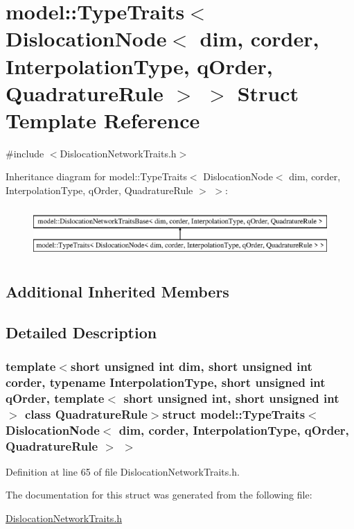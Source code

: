 \hypertarget{structmodel_1_1_type_traits_3_01_dislocation_node_3_01dim_00_01corder_00_01_interpolation_type_0c5626ad89ae64c98a058e51061d11ac7}{}\section{model\+:\+:Type\+Traits$<$ Dislocation\+Node$<$ dim, corder, Interpolation\+Type, q\+Order, Quadrature\+Rule $>$ $>$ Struct Template Reference}
\label{structmodel_1_1_type_traits_3_01_dislocation_node_3_01dim_00_01corder_00_01_interpolation_type_0c5626ad89ae64c98a058e51061d11ac7}


{\ttfamily \#include $<$Dislocation\+Network\+Traits.\+h$>$}

Inheritance diagram for model\+:\+:Type\+Traits$<$ Dislocation\+Node$<$ dim, corder, Interpolation\+Type, q\+Order, Quadrature\+Rule $>$ $>$\+:\begin{figure}[H]
\begin{center}
\leavevmode
\includegraphics[height=1.937716cm]{structmodel_1_1_type_traits_3_01_dislocation_node_3_01dim_00_01corder_00_01_interpolation_type_0c5626ad89ae64c98a058e51061d11ac7}
\end{center}
\end{figure}
\subsection*{Additional Inherited Members}


\subsection{Detailed Description}
\subsubsection*{template$<$short unsigned int dim, short unsigned int corder, typename Interpolation\+Type, short unsigned int q\+Order, template$<$ short unsigned int, short unsigned int $>$ class Quadrature\+Rule$>$struct model\+::\+Type\+Traits$<$ Dislocation\+Node$<$ dim, corder, Interpolation\+Type, q\+Order, Quadrature\+Rule $>$ $>$}



Definition at line 65 of file Dislocation\+Network\+Traits.\+h.



The documentation for this struct was generated from the following file\+:\begin{DoxyCompactItemize}
\item 
\hyperlink{_dislocation_network_traits_8h}{Dislocation\+Network\+Traits.\+h}\end{DoxyCompactItemize}
